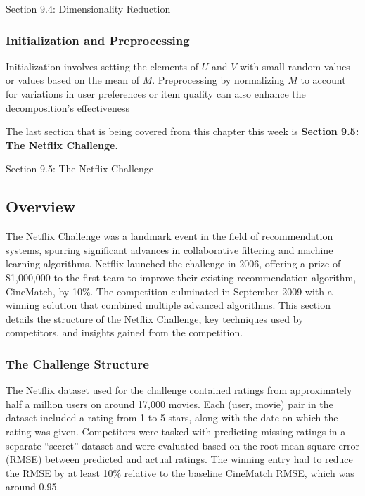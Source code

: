 \begin{notes}{Section 9.4: Dimensionality Reduction}
    \subsubsection*{Initialization and Preprocessing}
    
    Initialization involves setting the elements of $U$ and $V$ with small random values or values based on the mean of $M$. Preprocessing by normalizing $M$ to account for variations in user preferences 
    or item quality can also enhance the decomposition's effectiveness
\end{notes}

The last section that is being covered from this chapter this week is \textbf{Section 9.5: The Netflix Challenge}.

\begin{notes}{Section 9.5: The Netflix Challenge}
    \subsection*{Overview}

    The Netflix Challenge was a landmark event in the field of recommendation systems, spurring significant advances in collaborative filtering and machine learning algorithms. Netflix launched the challenge 
    in 2006, offering a prize of \$1,000,000 to the first team to improve their existing recommendation algorithm, CineMatch, by 10\%. The competition culminated in September 2009 with a winning solution that 
    combined multiple advanced algorithms. This section details the structure of the Netflix Challenge, key techniques used by competitors, and insights gained from the competition.
    
    \subsubsection*{The Challenge Structure}
    
    The Netflix dataset used for the challenge contained ratings from approximately half a million users on around 17,000 movies. Each (user, movie) pair in the dataset included a rating from 1 to 5 stars, along 
    with the date on which the rating was given. Competitors were tasked with predicting missing ratings in a separate “secret” dataset and were evaluated based on the root-mean-square error (RMSE) between 
    predicted and actual ratings. The winning entry had to reduce the RMSE by at least 10\% relative to the baseline CineMatch RMSE, which was around 0.95.
    

\end{notes}
